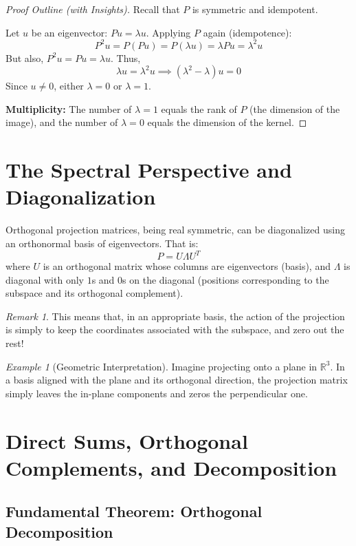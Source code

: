 \documentclass[11pt,a4paper]{article}
\theoremstyle{definition}
\theoremstyle{plain}
\theoremstyle{remark}
\newtheorem{remark}[definition]{Remark}
\newtheorem{example}[definition]{Example}
\begin{document}
\begin{proof}[Proof Outline (with Insights)]
Recall that $P$ is symmetric and idempotent.

Let $u$ be an eigenvector: $P u = \lambda u$. Applying $P$ again (idempotence):
\[
P^2 u = P(P u) = P(\lambda u) = \lambda P u = \lambda^2 u
\]
But also, $P^2 u = P u = \lambda u$. Thus,
\[
\lambda u = \lambda^2 u \implies (\lambda^2 - \lambda) u = 0
\]
Since $u \neq 0$, either $\lambda = 0$ or $\lambda = 1$.

\textbf{Multiplicity:} The number of $\lambda = 1$ equals the rank of $P$ (the dimension of the image), and the number of $\lambda = 0$ equals the dimension of the kernel.
\end{proof}

\section{The Spectral Perspective and Diagonalization}

Orthogonal projection matrices, being real symmetric, can be diagonalized using an orthonormal basis of eigenvectors. That is:
\[
P = U \Lambda U^T
\]
where $U$ is an orthogonal matrix whose columns are eigenvectors (basis), and $\Lambda$ is diagonal with only $1$s and $0$s on the diagonal (positions corresponding to the subspace and its orthogonal complement).

\begin{remark}
This means that, in an appropriate basis, the action of the projection is simply to keep the coordinates associated with the subspace, and zero out the rest!
\end{remark}

\begin{example}[Geometric Interpretation]
Imagine projecting onto a plane in $\mathbb{R}^3$. In a basis aligned with the plane and its orthogonal direction, the projection matrix simply leaves the in-plane components and zeros the perpendicular one.
\end{example}

\section{Direct Sums, Orthogonal Complements, and Decomposition}

\subsection{Fundamental Theorem: Orthogonal Decomposition}
\end{document}
